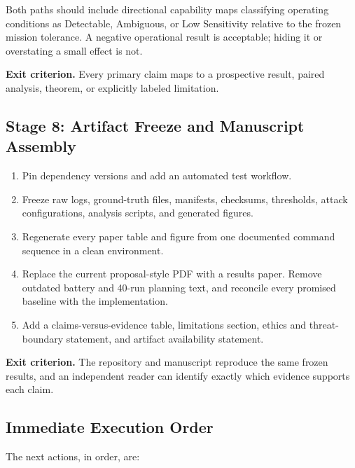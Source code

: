 \documentclass[11pt,a4paper]{article}
\begin{document}
Both paths should include directional capability maps classifying operating
conditions as Detectable, Ambiguous, or Low Sensitivity relative to the frozen
mission tolerance. A negative operational result is acceptable; hiding it or
overstating a small effect is not.

\textbf{Exit criterion.} Every primary claim maps to a prospective result,
paired analysis, theorem, or explicitly labeled limitation.

\subsection{Stage 8: Artifact Freeze and Manuscript Assembly}

\begin{enumerate}
    \item Pin dependency versions and add an automated test workflow.

    \item Freeze raw logs, ground-truth files, manifests, checksums, thresholds,
    attack configurations, analysis scripts, and generated figures.

    \item Regenerate every paper table and figure from one documented command
    sequence in a clean environment.

    \item Replace the current proposal-style PDF with a results paper. Remove
    outdated battery and 40-run planning text, and reconcile every promised
    baseline with the implementation.

    \item Add a claims-versus-evidence table, limitations section, ethics and
    threat-boundary statement, and artifact availability statement.
\end{enumerate}

\textbf{Exit criterion.} The repository and manuscript reproduce the same
frozen results, and an independent reader can identify exactly which evidence
supports each claim.

\subsection{Immediate Execution Order}

The next actions, in order, are:
\end{document}

